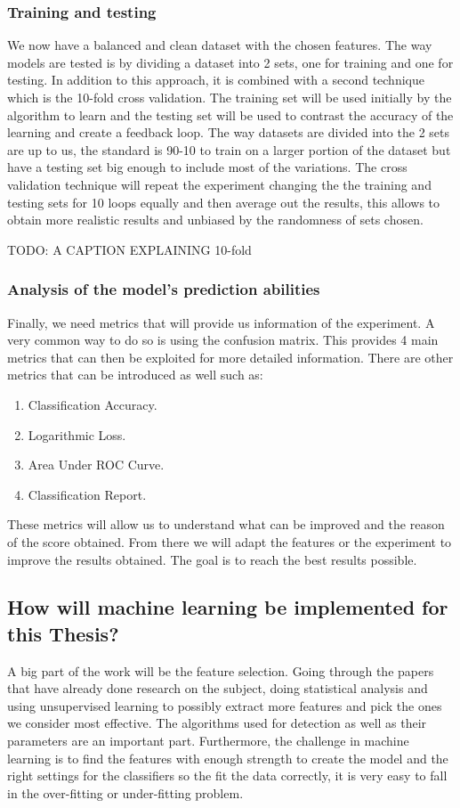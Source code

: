 \subsubsection{Training and testing}
We now have a balanced and clean dataset with the chosen features. The way models are tested is by dividing a dataset into 2 sets, one for training and one for testing. In addition to this approach, it is combined with a second technique which is the 10-fold cross validation\cite{10-fold}. The training set will be used initially by the algorithm to learn and the testing set will be used to contrast the accuracy of the learning and create a feedback loop. The way datasets are divided into the 2 sets are up to us, the standard is 90-10 to train on a larger portion of the dataset but have a testing set big enough to include most of the variations. The cross validation technique will repeat the experiment changing the the training and testing sets for 10 loops equally and then average out the results, this allows to obtain more realistic results and unbiased by the randomness of sets chosen.

TODO:  A CAPTION EXPLAINING 10-fold

\subsubsection{Analysis of the model's prediction abilities}
Finally, we need metrics that will provide us information of the experiment. A very common way to do so is using the confusion matrix. This provides 4 main metrics that can then be exploited for more detailed information. There are other metrics \cite{ml-metrics} that can be introduced as well such as: 
\begin{enumerate}
\item Classification Accuracy.
\item Logarithmic Loss.
\item Area Under ROC Curve.
\item Classification Report.
\end{enumerate}
These metrics will allow us to understand what can be improved and the reason of the score obtained. From there we will adapt the features or the experiment to improve the results obtained. The goal is to reach the best results possible.

\subsection{How will machine learning be implemented for this Thesis?}
A big part of the work will be the feature selection. Going through the papers that have already done research on the subject, doing statistical analysis and using unsupervised learning to possibly extract more features and pick the ones we consider most effective. The algorithms used for detection as well as their parameters are an important part. Furthermore, the challenge in machine learning is to find the features with enough strength to create the model and the right settings for the classifiers so the fit the data correctly, it is very easy to fall in the over-fitting or under-fitting problem.

